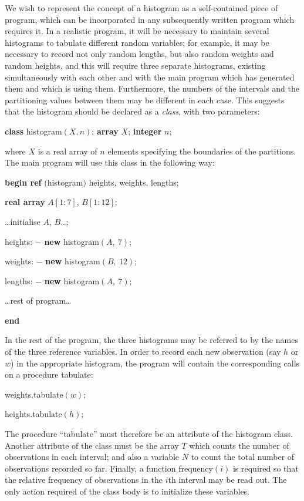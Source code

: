 We wish to represent the concept of a histogram as a self-contained piece of program, which can be incorporated in any subsequently written program which requires it. In a realistic program, it will be necessary to maintain several histograms to tabulate different random variables; for example, it may be necessary to record not only random lengths, but also random weights and random heights, and this will require three separate histograms, existing simultaneously with each other and with the main program which has generated them and which is using them. Furthermore, the numbers of the intervals and the partitioning values between them may be different in each case. This suggests that the histogram should be declared as a \textit{class}, with two parameters:

\quad \textbf{class} histogram$(X, n)$; \textbf{array} $X$; \textbf{integer} $n$;

\noindent
where $X$ is a real array of $n$ elements specifying the boundaries of the partitions. The main program will use this class in the following way:

\quad \textbf{begin ref} $($histogram$)$ heights, weights, lengths;

\quad \quad \textbf{real array} $A[1:7]$, $B[1:12]$;

\quad \quad \dots initialise $A$, $B$\dots;

\quad \quad heights: $-$ \textbf{new} histogram$(A,\ 7)$;

\quad \quad weights: $-$ \textbf{new} histogram$(B,\ 12)$;

\quad \quad lengths: $-$ \textbf{new} histogram$(A,\ 7)$;

\quad \quad \dots rest of program\dots

\quad \textbf{end}

In the rest of the program, the three histograms may be referred to by the names of the three reference variables. In order to record each new observation (say $h$ or $w$) in the appropriate histogram, the program will contain the corresponding calls on a procedure tabulate:

\quad weights.tabulate$(w);$

\quad heights.tabulate$(h);$

\noindent
The procedure ``tabulate'' must therefore be an attribute of the histogram class. Another attribute of the class must be the array $T$ which counts the number of observations in each interval; and also a variable $N$ to count the total number of observations recorded so far. Finally, a function frequency$(i)$ is required so that the relative frequency of observations in the $i$th interval may be read out. The only action required of the class body is to initialize these variables.

